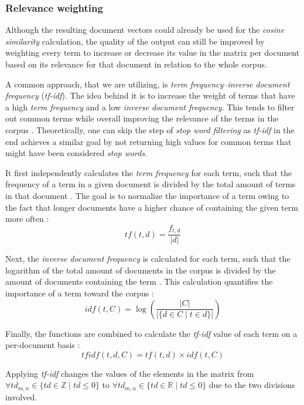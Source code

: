 \documentclass[12pt,a4paper]{report}
\begin{document}
\subsubsection{Relevance weighting}
Although the resulting document vectors could already be used for the
\textit{cosine similarity} calculation, the quality of the output
can still be improved by weighting every term to increase or decrease its value
in the matrix per document based on its relevance for that document in relation
to the whole corpus.

A common approach, that we are utilizing,
is \textit{term frequency–inverse document frequency} (\textit{tf-idf}).
The idea behind it is to increase the weight of terms that have
a high \textit{term frequency} and a low \textit{inverse document frequency}.
This tends to filter out common terms while overall improving the relevance
of the terms in the corpus \cite{robertson2004tfidf, singhal2001ir}.
Theoretically, one can skip the step of \textit{stop word filtering}
as \textit{tf-idf} in the end achieves a similar goal by not returning
high values for common terms that might have been considered \textit{stop words}.

It first independently calculates the \textit{term frequency} for each term,
such that the frequency of a term in a given document is divided by the total
amount of terms in that document \cite{robertson2004tfidf}.
The goal is to normalize the importance of a term owing to the fact
that longer documents have a higher chance of containing the given term
more often \cite{singhal2001ir}:
\[tf(t,d) = \frac{f_{t, d}}{\vert d \vert}\]

Next, the \textit{inverse document frequency} is calculated for each term,
such that the logarithm of the total amount of documents in the corpus
is divided by the amount of documents containing the term \cite{robertson2004tfidf}.
This calculation quantifies the importance of a term toward the corpus \cite{singhal2001ir}:
\[idf(t,C) = \log \left(\frac{\vert C \vert}{\vert \{d \in C \mid t \in d\} \vert}\right)\]

Finally, the functions are combined to calculate the \textit{tf-idf} value
of each term on a per-document basis \cite{robertson2004tfidf}:
\[tfidf(t,d,C) = tf(t,d) \times idf(t,C)\]

Applying \textit{tf-idf} changes the values of the elements in the matrix
from \(\forall td_{m,n} \in \{td \in \mathbb{Z} \mid td \le 0\}\)
to \(\forall td_{m,n} \in \{td \in \mathbb{R} \mid td \le 0\}\) due to
the two divisions involved.
\end{document}

